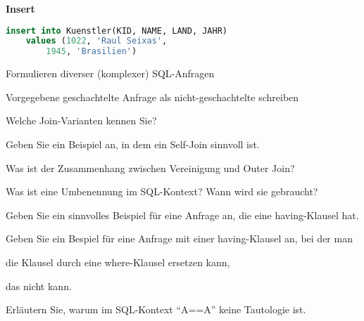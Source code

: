 \textbf{Insert}
\begin{items}
	\item
	\begin{lstlisting}[language=sql]
insert into Kuenstler(KID, NAME, LAND, JAHR)
	values (1022, 'Raul Seixas', 
		1945, 'Brasilien')
	\end{lstlisting}
\end{items}

\begin{fragen}
	\begin{enumeration}
		\item Formulieren diverser (komplexer) SQL-Anfragen
		\item Vorgegebene geschachtelte Anfrage als nicht-geschachtelte schreiben
		\item Welche Join-Varianten kennen Sie?
		\item Geben Sie ein Beispiel an, in dem ein Self-Join sinnvoll ist.
		\item Was ist der Zusammenhang zwischen Vereinigung und Outer Join?
		\item Was ist eine Umbenennung im SQL-Kontext? Wann wird sie gebraucht?
		\item Geben Sie ein sinnvolles Beispiel für eine Anfrage an, die eine having-Klausel hat.
		\item Geben Sie ein Bespiel für eine Anfrage mit einer having-Klausel an, bei der man
		\begin{enumeration}
			\item die Klausel durch eine where-Klausel ersetzen kann,
			\item das nicht kann.
		\end{enumeration}
		\item Erläutern Sie, warum im SQL-Kontext ``A==A'' keine Tautologie ist.
	\end{enumeration}
\end{fragen}